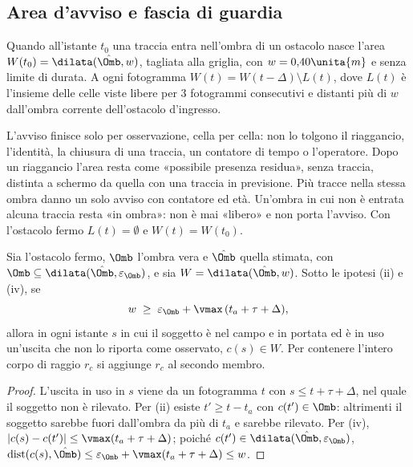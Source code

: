 \subsection{Area d'avviso e fascia di guardia}\label{sec:occ-avviso}

\begin{definizione}\label{def:occ-avviso}
Quando all'istante $t_0$ una traccia entra nell'ombra di un ostacolo nasce l'area $W(t_0)=\dilata(\hat\Omb,w)$, tagliata alla griglia, con $w=0{,}40\unita{m}$ e senza limite di durata. A ogni fotogramma $W(t)=W(t-\Delta)\setminus L(t)$, dove $L(t)$ è l'insieme delle celle viste libere per 3 fotogrammi consecutivi e distanti più di $w$ dall'ombra corrente dell'ostacolo d'ingresso.
\end{definizione}

L'avviso finisce solo per osservazione, cella per cella: non lo tolgono il riaggancio, l'identità, la chiusura di una traccia, un contatore di tempo o l'operatore. Dopo un riaggancio l'area resta come «possibile presenza residua», senza traccia, distinta a schermo da quella con una traccia in previsione. Più tracce nella stessa ombra danno un solo avviso con contatore ed età. Un'ombra in cui non è entrata alcuna traccia resta «in ombra»: non è mai «libero» e non porta l'avviso. Con l'ostacolo fermo $L(t)=\emptyset$ e $W(t)=W(t_0)$.

\begin{proposizione}\label{prop:occ-fascia}
Sia l'ostacolo fermo, $\Omb$ l'ombra vera e $\hat\Omb$ quella stimata, con $\Omb\subseteq\dilata(\hat\Omb,\varepsilon_\Omb)$, e sia $W=\dilata(\hat\Omb,w)$. Sotto le ipotesi (ii) e (iv), se
\begin{equation}\label{eq:occ-fascia}
w\;\ge\;\varepsilon_\Omb+\vmax\,(t_a+\tau+\Delta),
\end{equation}
allora in ogni istante $s$ in cui il soggetto è nel campo e in portata ed è in uso un'uscita che non lo riporta come osservato, $c(s)\in W$. Per contenere l'intero corpo di raggio $r_c$ si aggiunge $r_c$ al secondo membro. 
\end{proposizione}
\begin{proof}
L'uscita in uso in $s$ viene da un fotogramma $t$ con $s\le t+\tau+\Delta$, nel quale il soggetto non è rilevato. Per (ii) esiste $t'\ge t-t_a$ con $c(t')\in\Omb$: altrimenti il soggetto sarebbe fuori dall'ombra da più di $t_a$ e sarebbe rilevato. Per (iv), $|c(s)-c(t')|\le\vmax(t_a+\tau+\Delta)$; poiché $c(t')\in\dilata(\hat\Omb,\varepsilon_\Omb)$, $\operatorname{dist}(c(s),\hat\Omb)\le\varepsilon_\Omb+\vmax(t_a+\tau+\Delta)\le w$.
\end{proof}

